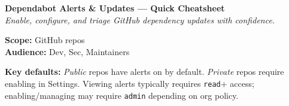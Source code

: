 \documentclass[11pt,letterpaper]{article}
\begin{document}
\begin{minipage}{0.72\linewidth}
  {\huge\bfseries Dependabot Alerts \& Updates — Quick Cheatsheet}\\[2pt]
  \textit{Enable, configure, and triage GitHub dependency updates with confidence.}
\end{minipage}
\hfill
\begin{minipage}{0.25\linewidth}
  \raggedleft \small
  \textbf{Scope:} GitHub repos \\
  \textbf{Audience:} Dev, Sec, Maintainers
\end{minipage}

\vspace{6pt}
\begin{callout}
\textbf{Key defaults:} \emph{Public} repos have alerts on by default. \emph{Private} repos require enabling in Settings. Viewing alerts typically requires \texttt{read}+ access; enabling/managing may require \texttt{admin} depending on org policy.
\end{callout}
\end{document}
